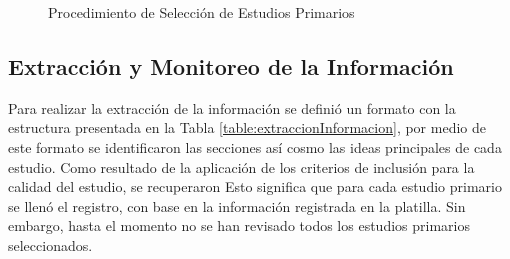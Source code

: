 \documentclass{report}
\begin{document}
            \begin{figure}
                \centering
        		\caption{Procedimiento de Selección de Estudios Primarios}
         	\end{figure}
         	
    	    \subsection{Extracción y Monitoreo de la Información}
    	    Para realizar la extracción de la información se definió un formato con la estructura presentada en la Tabla \ref{table:extraccionInformacion}, por medio de este formato se identificaron las secciones así cosmo las ideas principales de cada estudio.
    	    Como resultado de la aplicación de los criterios de inclusión para la calidad del estudio, se recuperaron 
			Esto significa que para cada estudio primario se llenó el registro, con base en la información registrada en la platilla. Sin embargo, hasta el momento no se han revisado todos los estudios primarios seleccionados.\\
\end{document}
